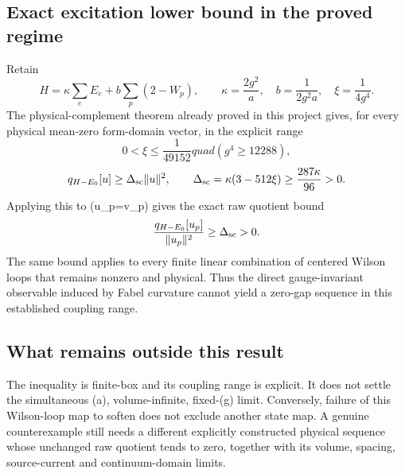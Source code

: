 \subsection{Exact excitation lower bound in the proved
regime}\label{fabel-curvature-to-physical-state-md-exact-excitation-lower-bound-in-the-proved-regime}

Retain \[
H=\kappa\sum_eE_e+b\sum_p(2-W_p),\qquad
\kappa=\frac{2g^2}{a},\quad b=\frac1{2g^2a},\quad \xi=\frac1{4g^4}.
\] The physical-complement theorem already proved in this project gives,
for every physical mean-zero form-domain vector, in the explicit range
\[
0<\xi\le\frac1{49152}quad(g^4\ge12288),
\] \[
q_{H-E_0}[u]\ge\Delta_{\rm sc}\|u\|^2,
\qquad
\Delta_{\rm sc}=\kappa(3-512\xi)\ge\frac{287\kappa}{96}>0.
\] Applying this to (u\_p=\psi v\_p) gives the exact raw quotient bound
\[
\frac{q_{H-E_0}[u_p]}{\|u_p\|^2}\ge\Delta_{\rm sc}>0.
\] The same bound applies to every finite linear combination of centered
Wilson loops that remains nonzero and physical. Thus the direct
gauge-invariant observable induced by Fabel curvature cannot yield a
zero-gap sequence in this established coupling range.

\subsection{What remains outside this
result}\label{fabel-curvature-to-physical-state-md-what-remains-outside-this-result}

The inequality is finite-box and its coupling range is explicit. It does
not settle the simultaneous (a), volume-infinite, fixed-(g)
limit. Conversely, failure of this Wilson-loop map to soften does not
exclude another state map. A genuine counterexample still needs a
different explicitly constructed physical sequence whose unchanged raw
quotient tends to zero, together with its volume, spacing,
source-current and continuum-domain limits.
